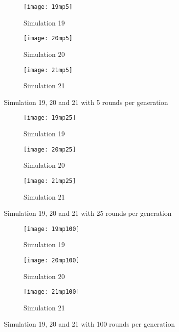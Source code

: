 \begin{figure}[H]       
    \centering
    \begin{subfigure}[b]{0.3\textwidth}
	\centering
	{\texttt{[image: 19mp5]}}   
    	\caption{Simulation 19}
	\label{fig:mpsim195}
    \end{subfigure}
    \hfill
    \begin{subfigure}[b]{0.3\textwidth}
	\centering
	{\texttt{[image: 20mp5]}}   
    	\caption{Simulation 20}
	\label{fig:mpsim205}
    \end{subfigure}
    \hfill
    \begin{subfigure}[b]{0.3\textwidth}
	\centering
	{\texttt{[image: 21mp5]}}   
    	\caption{Simulation 21}
	\label{fig:mpsim215}
    \end{subfigure}
    \caption{Simulation 19, 20 and 21 with 5 rounds per generation}
    \label{mpsim192021simulations5}
\end{figure}


\begin{figure}[H]       
    \centering
    \begin{subfigure}[b]{0.3\textwidth}
	\centering
	{\texttt{[image: 19mp25]}}   
    	\caption{Simulation 19}
	\label{fig:mpsim1925}
    \end{subfigure}
    \hfill
    \begin{subfigure}[b]{0.3\textwidth}
	\centering
	{\texttt{[image: 20mp25]}}   
    	\caption{Simulation 20}
	\label{fig:mpsim2025}
    \end{subfigure}
    \hfill
    \begin{subfigure}[b]{0.3\textwidth}
	\centering
	{\texttt{[image: 21mp25]}}   
    	\caption{Simulation 21}
	\label{fig:mpsim2125}
    \end{subfigure}
    \caption{Simulation 19, 20 and 21 with 25 rounds per generation}
    \label{mpsim192021simulations25}
\end{figure}

\begin{figure}[H]       
    \centering
    \begin{subfigure}[b]{0.3\textwidth}
	\centering
	{\texttt{[image: 19mp100]}}   
    	\caption{Simulation 19}
	\label{fig:mpsim19100}
    \end{subfigure}
    \hfill
    \begin{subfigure}[b]{0.3\textwidth}
	\centering
	{\texttt{[image: 20mp100]}}   
    	\caption{Simulation 20}
	\label{fig:mpsim20100}
    \end{subfigure}
    \hfill
    \begin{subfigure}[b]{0.3\textwidth}
	\centering
	{\texttt{[image: 21mp100]}}   
    	\caption{Simulation 21}
	\label{fig:mpsim21100}
    \end{subfigure}
    \caption{Simulation 19, 20 and 21 with 100 rounds per generation}
    \label{mpsim192021simulations100}
\end{figure}

